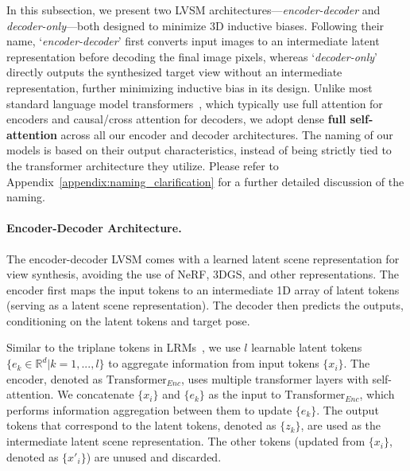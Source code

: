 In this subsection, we present two LVSM architectures---\textit{encoder-decoder} and \textit{decoder-only}---both designed to minimize 3D inductive biases.
Following their name, `\textit{encoder-decoder}' first converts input images to an intermediate latent representation before decoding the final image pixels, whereas `\textit{decoder-only}' directly outputs the synthesized target view without an intermediate representation, further minimizing inductive bias in its design. 
Unlike most standard language model transformers~\citep{vaswani2017transformer,jaegle2021perceiver, radford2019language}, which typically use full attention for encoders and causal/cross attention for decoders, we adopt dense \textbf{full self-attention} across all our encoder and decoder architectures. 
The naming of our models is based on their output characteristics, instead of being strictly tied to the transformer architecture they utilize.
Please refer to Appendix~\ref{appendix:naming_clarification} for a further detailed discussion of the naming. 



\paragraph{Encoder-Decoder Architecture.}
The encoder-decoder LVSM comes with a learned latent scene representation for view synthesis, avoiding the use of NeRF, 3DGS, and other representations.
The encoder first maps the input tokens to an intermediate 1D array of latent tokens (serving as a latent scene representation). The decoder then predicts the outputs, conditioning on the latent tokens and target pose.

Similar to the triplane tokens in LRMs~\citep{hong2024lrmlargereconstructionmodel,wei2024meshlrm}, we use $l$ learnable latent tokens $\{e_k \in \mathbb{R}^d \vert k=1, ..., l \}$ to aggregate information from input tokens $\{x_i\}$. The encoder, denoted as $\mathrm{Transformer}_\mathit{Enc}$, uses multiple transformer layers with self-attention. We concatenate $\{x_i\}$ and $\{e_k\}$ as the input to $\mathrm{Transformer}_\mathit{Enc}$, which performs information aggregation between them to update $\{e_k\}$. 
The output tokens that correspond to the latent tokens, denoted as $\{z_k\}$, are used as the intermediate latent scene representation. The other tokens (updated from $\{x_i\}$, denoted as $\{x'_i\}$) are unused and discarded.


